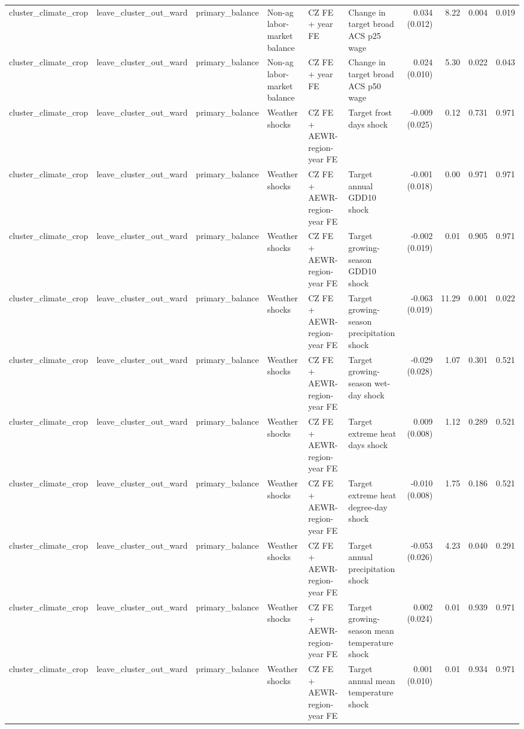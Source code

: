 \begin{tabular}{llllllrrrr}
cluster_climate_crop & leave_cluster_out_ward & primary_balance & Non-ag labor-market balance & CZ FE + year FE & Change in target broad ACS p25 wage & 0.034 (0.012) & 8.22 & 0.004 & 0.019 \\
cluster_climate_crop & leave_cluster_out_ward & primary_balance & Non-ag labor-market balance & CZ FE + year FE & Change in target broad ACS p50 wage & 0.024 (0.010) & 5.30 & 0.022 & 0.043 \\
cluster_climate_crop & leave_cluster_out_ward & primary_balance & Weather shocks & CZ FE + AEWR-region-year FE & Target frost days shock & -0.009 (0.025) & 0.12 & 0.731 & 0.971 \\
cluster_climate_crop & leave_cluster_out_ward & primary_balance & Weather shocks & CZ FE + AEWR-region-year FE & Target annual GDD10 shock & -0.001 (0.018) & 0.00 & 0.971 & 0.971 \\
cluster_climate_crop & leave_cluster_out_ward & primary_balance & Weather shocks & CZ FE + AEWR-region-year FE & Target growing-season GDD10 shock & -0.002 (0.019) & 0.01 & 0.905 & 0.971 \\
cluster_climate_crop & leave_cluster_out_ward & primary_balance & Weather shocks & CZ FE + AEWR-region-year FE & Target growing-season precipitation shock & -0.063 (0.019) & 11.29 & 0.001 & 0.022 \\
cluster_climate_crop & leave_cluster_out_ward & primary_balance & Weather shocks & CZ FE + AEWR-region-year FE & Target growing-season wet-day shock & -0.029 (0.028) & 1.07 & 0.301 & 0.521 \\
cluster_climate_crop & leave_cluster_out_ward & primary_balance & Weather shocks & CZ FE + AEWR-region-year FE & Target extreme heat days shock & 0.009 (0.008) & 1.12 & 0.289 & 0.521 \\
cluster_climate_crop & leave_cluster_out_ward & primary_balance & Weather shocks & CZ FE + AEWR-region-year FE & Target extreme heat degree-day shock & -0.010 (0.008) & 1.75 & 0.186 & 0.521 \\
cluster_climate_crop & leave_cluster_out_ward & primary_balance & Weather shocks & CZ FE + AEWR-region-year FE & Target annual precipitation shock & -0.053 (0.026) & 4.23 & 0.040 & 0.291 \\
cluster_climate_crop & leave_cluster_out_ward & primary_balance & Weather shocks & CZ FE + AEWR-region-year FE & Target growing-season mean temperature shock & 0.002 (0.024) & 0.01 & 0.939 & 0.971 \\
cluster_climate_crop & leave_cluster_out_ward & primary_balance & Weather shocks & CZ FE + AEWR-region-year FE & Target annual mean temperature shock & 0.001 (0.010) & 0.01 & 0.934 & 0.971 \\

\end{tabular}
